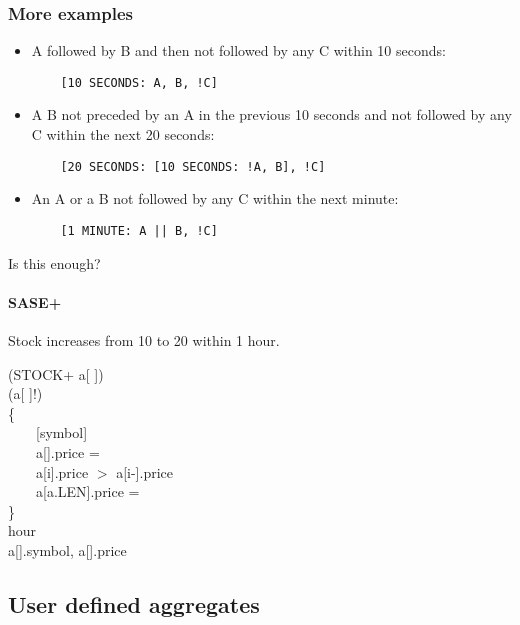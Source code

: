 \documentclass[brown, compress, mathserif]{beamer}
\begin{document}
\begin{frame}[fragile]
  \frametitle{More examples}
  \begin{itemize}
  \item A followed by B and then not followed by any C within 10 seconds:
\begin{verbatim}
    [10 SECONDS: A, B, !C]
\end{verbatim}
  \item A B not preceded by an A in the previous 10 seconds and not followed by any C within the next 20 seconds:
\begin{verbatim}
    [20 SECONDS: [10 SECONDS: !A, B], !C]
\end{verbatim}
  \item An A or a B not followed by any C within the next minute:
\begin{verbatim}
    [1 MINUTE: A || B, !C]
\end{verbatim}
  \end{itemize}

\end{frame}

\begin{frame}{Is this enough?}
\framesubtitle{SASE+}
  \begin{center}
    \begin{example}
      Stock increases from 10 to 20 within 1 hour.
    \end{example}
  \end{center}
(STOCK+ a[ ])\\
 (a[ ]!)\\
    \{\\
    \ \ \ \ [symbol] \\
    \ \ \ \   a[].price =  \\
    \ \ \ \   a[i].price $>$ a[i-].price \\
    \ \ \ \   a[a.LEN].price = \\
    \}\\
  hour\\
 a[].symbol, a[].price \hlstd{}\hspace*{\fill}\\
\end{frame}

\subsection{User defined aggregates}
\end{document}
